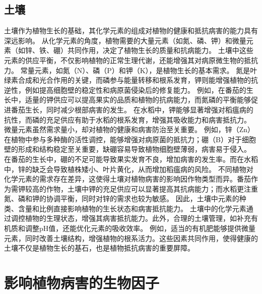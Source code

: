 \documentclass[AutoFakeBold]{LZUThesis-PgD&PhD}
\begin{document}
\subsection{土壤}
土壤作为植物生长的基础，其化学元素的组成对植物的健康和抵抗病害的能力具有深远影响。
从化学元素的角度，植物需要的大量元素（如氮、磷、钾）和微量元素（如锌、铁、硼）共同作用，决定了植物生长的质量和抗病能力。
土壤中这些元素的供应平衡，不仅影响植物的正常生理代谢，还能增强其对病原微生物的抵抗力。
常量元素，如氮（N）、磷（P）和钾（K），是植物生长的基本需求。
氮是叶绿素合成和光合作用的关键，而磷参与能量转移和根系发育，钾则能增强植物的抗逆性，例如提高细胞壁的稳定性和病原菌侵染后的修复能力。
例如，在番茄的生长中，适量的钾供应可以提高果实的品质和植物的抗病能力，而氮磷的平衡能够促进番茄生长，同时减少根部病害的发生。
在水稻中，钾能够显著增强对稻瘟病的抗性，而磷的充足供应有助于水稻的根系发育，增强其吸收能力和病害抵抗力。
微量元素虽然需求量小，却对植物的健康和病害防治至关重要。
例如，锌（Zn）在植物中参与多种酶的活性调控，能够增强对病原菌的抵抗力；硼（B）对于细胞壁的形成和结构稳定至关重要，缺硼容易导致植物细胞壁薄弱，病害易于侵入。
在番茄的生长中，硼的不足可能导致果实发育不良，增加病害的发生率。而在水稻中，锌的缺乏会导致植株矮小、叶片黄化，从而增加稻瘟病的风险。
不同植物对化学元素的需求存在差异，这使得土壤对植物病害的影响因作物类型而异。番茄作为需钾较高的作物，土壤中钾的充足供应可以显著提高其抗病能力；而水稻更注重氮、磷和钾的协调平衡，同时对锌的需求也较为敏感。
因此，土壤中元素的种类、含量和比例直接影响植物的生长状态和病害抵抗能力。
土壤中的化学元素通过调控植物的生理状态，增强其病害抵抗能力。此外，合理的土壤管理，如补充有机质和调整pH值，还能优化元素的吸收效率。
例如，适当的有机肥能够提供微量元素，同时改善土壤结构，增强植物的根系活力。这些因素共同作用，使得健康的土壤不仅是植物生长的基石，也是植物抵抗病害的重要屏障。

\section{影响植物病害的生物因子}
\end{document}
